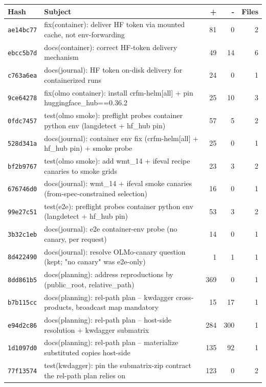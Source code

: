 \begin{longtable}{@{}p{}p{}r r r@{}}
\toprule Hash & Subject & + & - & Files \\ \midrule\endhead
\texttt{ae14bc77} & fix(container): deliver HF token via mounted cache, not env-forwarding & 81 & 0 & 2 \\
\texttt{ebcc5b7d} & docs(container): correct HF-token delivery mechanism & 49 & 14 & 6 \\
\texttt{c763a6ea} & docs(journal): HF token on-disk delivery for containerized runs & 24 & 0 & 1 \\
\texttt{9ce64278} & fix(olmo container): install crfm-helm[all] + pin huggingface\_hub==0.36.2 & 25 & 10 & 3 \\
\texttt{0fdc7457} & test(olmo smoke): preflight probes container python env (langdetect + hf\_hub pin) & 57 & 5 & 2 \\
\texttt{528d341a} & docs(journal): container env fix (crfm-helm[all] + hf\_hub pin) + smoke probe & 25 & 0 & 1 \\
\texttt{bf2b9767} & test(olmo smoke): add wmt\_14 + ifeval recipe canaries to smoke grids & 23 & 3 & 2 \\
\texttt{676746d0} & docs(journal): wmt\_14 + ifeval smoke canaries (from-spec-constrained selection) & 16 & 0 & 1 \\
\texttt{99e27c51} & test(e2e): preflight probes container python env (langdetect + hf\_hub pin) & 53 & 3 & 2 \\
\texttt{3b32c1eb} & docs(journal): e2e container-env probe (no canary, per request) & 14 & 0 & 1 \\
\texttt{8d422490} & docs(journal): resolve OLMo-canary question (kept; "no canary" was e2e-only) & 1 & 1 & 1 \\
\texttt{8dd861b5} & docs(planning): address reproductions by (public\_root, relative\_path) & 369 & 0 & 1 \\
\texttt{b7b115cc} & docs(planning): rel-path plan -- kwdagger cross-products, broadcast map mandatory & 15 & 17 & 1 \\
\texttt{e94d2c86} & docs(planning): rel-path plan -- host-side resolution + kwdagger submatrix & 284 & 300 & 1 \\
\texttt{1d1097d0} & docs(planning): rel-path plan -- materialize substituted copies host-side & 135 & 92 & 1 \\
\texttt{77f13574} & test(kwdagger): pin the submatrix-zip contract the rel-path plan relies on & 123 & 0 & 2 \\

\end{longtable}
